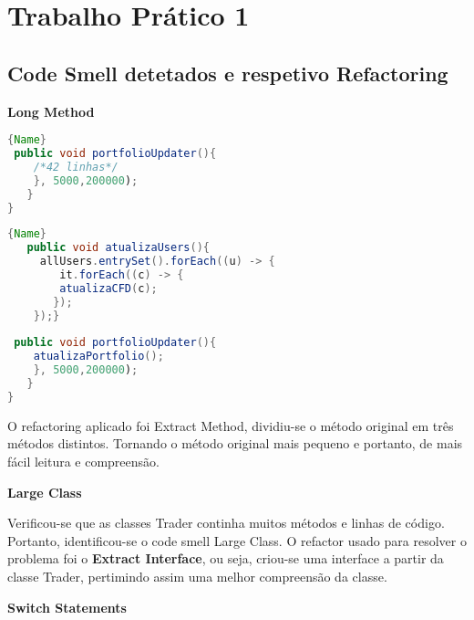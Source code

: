 \section{Trabalho Prático 1}\label{sec:Tp1}

\subsection{Code Smell detetados e respetivo Refactoring}

\textbf{Long Method}

\noindent\begin{minipage}{.45\textwidth}
\begin{lstlisting}[breaklines,caption=Original,frame=tlrb,language=java]{Name}
 public void portfolioUpdater(){
    /*42 linhas*/
    }, 5000,200000);
   }
}
\end{lstlisting}
\end{minipage}\hfill
\begin{minipage}{.45\textwidth}
\begin{lstlisting}[breaklines,caption=Refactored,frame=tlrb,language=java]{Name}
   public void atualizaUsers(){
     allUsers.entrySet().forEach((u) -> {
        it.forEach((c) -> {
        atualizaCFD(c);
       });
    });}
    
 public void portfolioUpdater(){
    atualizaPortfolio();
    }, 5000,200000);
   }
}
\end{lstlisting}
\end{minipage}
\vspace{4mm}
\newline
O refactoring aplicado foi Extract Method, dividiu-se o método original em três métodos distintos. Tornando o método original mais pequeno e portanto, de mais fácil leitura e compreensão.

\vspace{5mm}
\textbf{Large Class}

Verificou-se que as classes Trader continha muitos métodos e linhas de código. Portanto, identificou-se o code smell Large Class. O refactor usado para resolver o problema foi o \textbf{Extract Interface}, ou seja, criou-se uma interface a partir da classe Trader, pertimindo assim uma melhor compreensão da classe.
\newpage

\textbf{Switch Statements}

